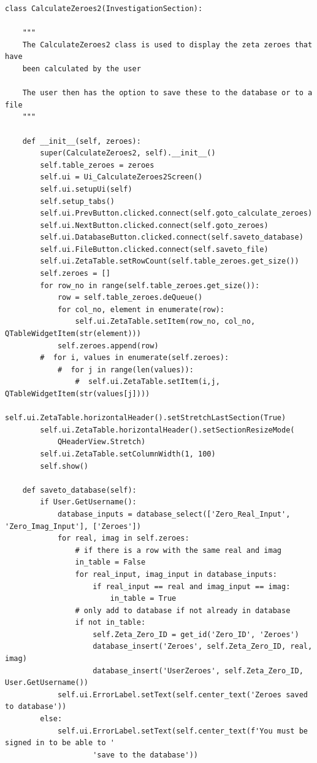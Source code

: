 \documentclass[12pt]{article}
\begin{document}
\begin{lstlisting}
class CalculateZeroes2(InvestigationSection):

    """
    The CalculateZeroes2 class is used to display the zeta zeroes that have
    been calculated by the user

    The user then has the option to save these to the database or to a file
    """

    def __init__(self, zeroes):
        super(CalculateZeroes2, self).__init__()
        self.table_zeroes = zeroes
        self.ui = Ui_CalculateZeroes2Screen()
        self.ui.setupUi(self)
        self.setup_tabs()
        self.ui.PrevButton.clicked.connect(self.goto_calculate_zeroes)
        self.ui.NextButton.clicked.connect(self.goto_zeroes)
        self.ui.DatabaseButton.clicked.connect(self.saveto_database)
        self.ui.FileButton.clicked.connect(self.saveto_file)
        self.ui.ZetaTable.setRowCount(self.table_zeroes.get_size())
        self.zeroes = []
        for row_no in range(self.table_zeroes.get_size()):
            row = self.table_zeroes.deQueue()
            for col_no, element in enumerate(row):
                self.ui.ZetaTable.setItem(row_no, col_no, QTableWidgetItem(str(element)))
            self.zeroes.append(row)
        #  for i, values in enumerate(self.zeroes):
            #  for j in range(len(values)):
                #  self.ui.ZetaTable.setItem(i,j, QTableWidgetItem(str(values[j])))
        self.ui.ZetaTable.horizontalHeader().setStretchLastSection(True)
        self.ui.ZetaTable.horizontalHeader().setSectionResizeMode(
            QHeaderView.Stretch)
        self.ui.ZetaTable.setColumnWidth(1, 100)
        self.show()

    def saveto_database(self):
        if User.GetUsername():
            database_inputs = database_select(['Zero_Real_Input', 'Zero_Imag_Input'], ['Zeroes'])
            for real, imag in self.zeroes:
                # if there is a row with the same real and imag
                in_table = False
                for real_input, imag_input in database_inputs:
                    if real_input == real and imag_input == imag:
                        in_table = True
                # only add to database if not already in database
                if not in_table:
                    self.Zeta_Zero_ID = get_id('Zero_ID', 'Zeroes')
                    database_insert('Zeroes', self.Zeta_Zero_ID, real, imag)
                    database_insert('UserZeroes', self.Zeta_Zero_ID, User.GetUsername())
            self.ui.ErrorLabel.setText(self.center_text('Zeroes saved to database'))
        else:
            self.ui.ErrorLabel.setText(self.center_text(f'You must be signed in to be able to '
                    'save to the database'))


\end{lstlisting}
\end{document}
